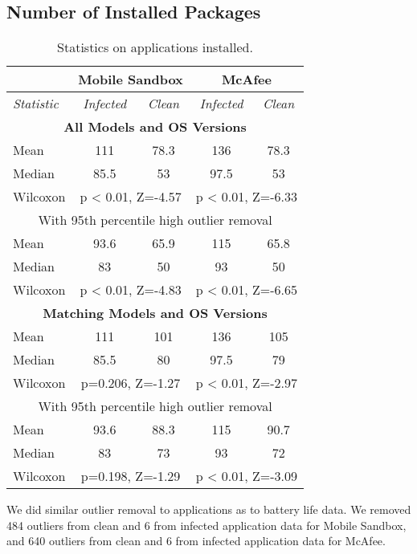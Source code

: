 \subsection{Number of Installed Packages}
\label{subsec:predictions:pkg-number}
\begin{table}
\centering
\small{
\begin{tabular}{|l|c c|c c|}
\hline
& \multicolumn{2}{c|}{\textbf{Mobile Sandbox}} & \multicolumn{2}{c|}{\textbf{McAfee}} \\
\hline
\textit{Statistic} & \textit{Infected} & \textit{Clean} & \textit{Infected} & \textit{Clean} \\
\hline
\multicolumn{5}{c}{\textbf{All Models and OS Versions}} \\
\hline
Mean & 111 & 78.3  & 	 136 & 78.3  \\ 
Median & 85.5 & 53 & 	 97.5 & 53 \\ 
Wilcoxon & \multicolumn{2}{c|}{p < 0.01, Z=-4.57} & 	 \multicolumn{2}{c|}{p < 0.01, Z=-6.33} \\ 
\hline
\multicolumn{5}{c}{With 95th percentile high outlier removal} \\ 
\hline
Mean & 93.6 & 65.9 & 	 115 & 65.8 \\ 
Median & 83 & 50 & 	 93 & 50 \\ 
Wilcoxon & \multicolumn{2}{c|}{p < 0.01, Z=-4.83} & 	 \multicolumn{2}{c|}{p < 0.01, Z=-6.65} \\ 
\hline
\multicolumn{5}{c}{\textbf{Matching Models and OS Versions}} \\
\hline
Mean & 111 & 101  & 	 136 & 105  \\ 
Median & 85.5 & 80 & 	 97.5 & 79 \\ 
Wilcoxon & \multicolumn{2}{c|}{p=0.206, Z=-1.27} & 	 \multicolumn{2}{c|}{p < 0.01, Z=-2.97} \\ 
\hline
\multicolumn{5}{c}{With 95th percentile high outlier removal} \\
\hline
Mean & 93.6 & 88.3 & 	 115 & 90.7 \\ 
Median & 83 & 73 & 	 93 & 72 \\ 
Wilcoxon & \multicolumn{2}{c|}{p=0.198, Z=-1.29} & 	 \multicolumn{2}{c|}{p < 0.01, Z=-3.09} \\ 
\hline
\end{tabular}
}
\caption{Statistics on applications installed.\label{tbl:appresults}}
\end{table}
We did similar outlier removal to applications as to battery life data.
We removed 484 outliers from clean and 6 from infected application data for Mobile Sandbox,
and 640 outliers from clean and 6 from infected application
data for McAfee.

